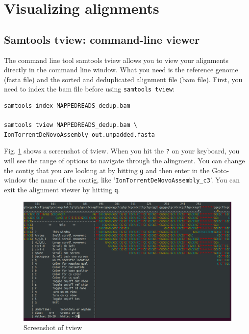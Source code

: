 \documentclass[11pt]{article}
\begin{document}
\section{Visualizing alignments}
\label{sec-3}
\subsection{Samtools tview: command-line viewer}
\label{sec-3-1}
The command line tool samtools tview allows you to view your
alignments directly in the command line window. What you need is the
reference genome (fasta file) and the sorted and deduplicated
alignment file (bam file). First, you need to index the bam file
before using \texttt{samtools tview}:


\begin{verbatim}
samtools index MAPPEDREADS_dedup.bam

samtools tview MAPPEDREADS_dedup.bam \
IonTorrentDeNovoAssembly_out.unpadded.fasta
\end{verbatim}


Fig. \ref{fig:tview} shows a screenshot of tview.  When you hit the \texttt{?} on
your keyboard, you will see the range of options to navigate through
the alingment. You can change the contig that you are looking at by
hitting \texttt{g} and then enter in the Goto-window the name of the contig,
like '\texttt{IonTorrentDeNovoAssembly\_c3}'.  You can exit the alignment viewer
by hitting \texttt{q}.

\begin{figure}[htb]
\centering
\includegraphics[width=14.5cm]{tview.png}
\caption{\label{fig:tview}Screenshot of tview}
\end{figure}

\clearpage
\end{document}
